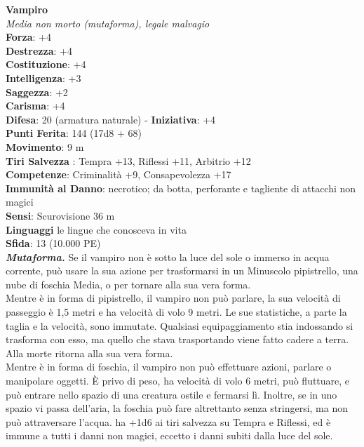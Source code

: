 \begin{multicols}{2}
\medskip\textbf{Vampiro}\\
\emph{Media non morto (mutaforma), legale malvagio}\\
\textbf{Forza}: +4\\
\textbf{Destrezza}: +4\\
\textbf{Costituzione}: +4\\
\textbf{Intelligenza}: +3\\
\textbf{Saggezza}: +2\\
\textbf{Carisma}: +4\\
\textbf{Difesa}: 20 (armatura naturale) - \textbf{Iniziativa}: +4\\
\textbf{Punti Ferita}: 144 (17d8 + 68)\\
\textbf{Movimento}: 9 m\\
\textbf{Tiri Salvezza} : Tempra +13, Riflessi +11, Arbitrio +12\\
\textbf{Competenze}: Criminalità +9, Consapevolezza +17\\
\textbf{Immunità al Danno}: necrotico; da botta, perforante e tagliente di attacchi non magici\\
\textbf{Sensi}: Scurovisione 36 m\\
\textbf{Linguaggi} le lingue che conosceva in vita\\
\textbf{Sfida}: 13 (10.000 PE)\smallskip\\

\emph{\textbf{Mutaforma.}} Se il vampiro non è sotto la luce del sole o immerso in acqua corrente, può usare la sua azione per trasformarsi in un Minuscolo pipistrello, una nube di foschia Media, o per tornare alla sua vera forma.\\
Mentre è in forma di pipistrello, il vampiro non può parlare, la sua velocità di passeggio è 1,5 metri e ha velocità di volo 9 metri. Le sue statistiche, a parte la taglia e la velocità, sono immutate. Qualsiasi equipaggiamento stia indossando si trasforma con esso, ma quello che stava trasportando viene fatto cadere a terra. Alla morte ritorna alla sua vera forma.\\

Mentre è in forma di foschia, il vampiro non può effettuare azioni, parlare o manipolare oggetti. È privo di peso, ha velocità di volo 6 metri, può fluttuare, e può entrare nello spazio di una creatura ostile e fermarsi lì. Inoltre, se in uno spazio vi passa dell'aria, la foschia può fare altrettanto senza stringersi, ma non può attraversare l'acqua. ha +1d6 ai tiri salvezza su Tempra e Riflessi, ed è immune a tutti i danni non magici, eccetto i danni subiti dalla luce del sole.\\


\end{multicols}
